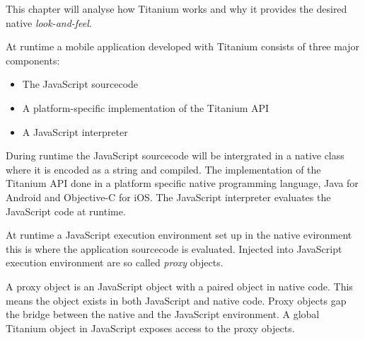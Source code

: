 
This chapter will analyse how Titanium works and why it provides the desired native \emph{look-and-feel}.



At runtime a mobile application developed with Titanium consists of three major components:
\begin{itemize}
	\item
	The JavaScript sourcecode
	\item
	A platform-specific implementation of the Titanium API
	\item
	A JavaScript interpreter
\end{itemize}

During runtime the JavaScript sourcecode will be intergrated in a native class where it is encoded as a string and compiled. The implementation of the Titanium API done in a platform specific native programming language, Java for Android and Objective-C for iOS. The JavaScript interpreter evaluates the JavaScript code at runtime.


At runtime a JavaScript execution environment set up in the native evironment this is where the application sourcecode is evaluated. Injected into JavaScript execution environment are so called \emph{proxy} objects.

A proxy object is an JavaScript object with a paired object in native code.\cite{Whinnery2012} This means the object exists in both JavaScript and native code. Proxy objects gap the bridge between the native and the JavaScript environment. A global Titanium object in JavaScript exposes access to the proxy objects. 




